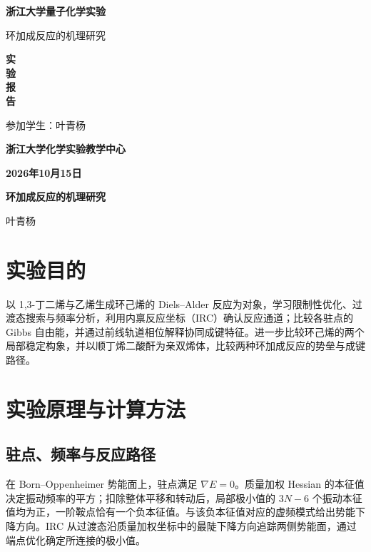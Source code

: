 \documentclass[a4paper,12pt]{article}
\newcommand{\xiaoyi}{\fontsize{24pt}{36pt}\selectfont}
\newcommand{\erhao}{\fontsize{22pt}{28pt}\selectfont}
\newcommand{\xiaoer}{\fontsize{18pt}{24pt}\selectfont}
\newcommand{\xiaosan}{\fontsize{15pt}{22pt}\selectfont}
\newcommand{\sihao}{\fontsize{14pt}{21pt}\selectfont}
\newcommand{\xiaosi}{\fontsize{12pt}{18pt}\selectfont}
\newcommand{\ReportTitle}{环加成反应的机理研究}
\begin{document}
\begin{titlepage}
\centering
\vspace*{1cm}
{\xiaoyi\bfseries 浙江大学量子化学实验\par}
\vspace{1cm}
{\sffamily\xiaoer \ReportTitle\par}
\vspace{0.7cm}
{\sffamily\erhao\bfseries 实\\[0.32cm]验\\[0.32cm]报\\[0.32cm]告\par}
\vfill
{\sihao 参加学生：叶青杨\par}
\vspace{1cm}
{\xiaoer\bfseries 浙江大学化学实验教学中心\par}
\vspace{0.5cm}
{\xiaoer\bfseries 2026年10月15日\par}
\end{titlepage}
\setcounter{page}{1}
\begin{center}
{\sffamily\xiaosan\bfseries \ReportTitle\par}
\vspace{0.4em}
{\xiaosi 叶青杨\par}
\end{center}
\xiaosi

\section{实验目的}
以 1,3-丁二烯与乙烯生成环己烯的 Diels--Alder 反应为对象，学习限制性优化、过渡态搜索与频率分析，利用内禀反应坐标（IRC）确认反应通道；比较各驻点的 Gibbs 自由能，并通过前线轨道相位解释协同成键特征\cite{course}。进一步比较环己烯的两个局部稳定构象，并以顺丁烯二酸酐为亲双烯体，比较两种环加成反应的势垒与成键路径。

\section{实验原理与计算方法}
\subsection{驻点、频率与反应路径}
在 Born--Oppenheimer 势能面上，驻点满足 $\nabla E=0$。质量加权 Hessian 的本征值决定振动频率的平方；扣除整体平移和转动后，局部极小值的 $3N-6$ 个振动本征值均为正，一阶鞍点恰有一个负本征值。与该负本征值对应的虚频模式给出势能下降方向。IRC 从过渡态沿质量加权坐标中的最陡下降方向追踪两侧势能面，通过端点优化确定所连接的极小值。
\end{document}
